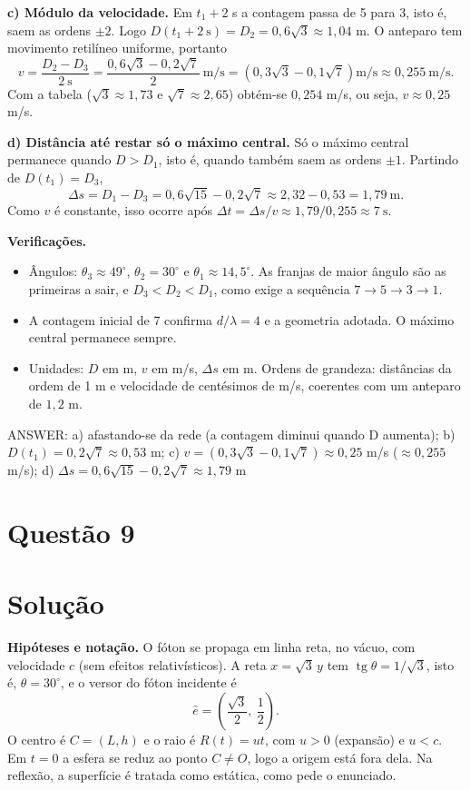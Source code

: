 \documentclass{article}%
\begin{document}
\textbf{c) Módulo da velocidade.} Em $t_1+2$ s a contagem passa de 5 para 3, isto é, saem as ordens $\pm 2$. Logo $D(t_1+2\ \text{s})=D_2=0{,}6\sqrt{3}\approx 1{,}04$ m. O anteparo tem movimento retilíneo uniforme, portanto
\[
v=\frac{D_2-D_3}{2\ \text{s}}=\frac{0{,}6\sqrt{3}-0{,}2\sqrt{7}}{2}\ \text{m/s}=\left(0{,}3\sqrt{3}-0{,}1\sqrt{7}\right)\text{m/s}\approx 0{,}255\ \text{m/s}.
\]
Com a tabela ($\sqrt{3}\approx 1{,}73$ e $\sqrt{7}\approx 2{,}65$) obtém-se $0{,}254$ m/s, ou seja, $v\approx 0{,}25$ m/s.

\textbf{d) Distância até restar só o máximo central.} Só o máximo central permanece quando $D>D_1$, isto é, quando também saem as ordens $\pm 1$. Partindo de $D(t_1)=D_3$,
\[
\Delta s=D_1-D_3=0{,}6\sqrt{15}-0{,}2\sqrt{7}\approx 2{,}32-0{,}53=1{,}79\ \text{m}.
\]
Como $v$ é constante, isso ocorre após $\Delta t=\Delta s/v\approx 1{,}79/0{,}255\approx 7\ \text{s}$.

\textbf{Verificações.}
\begin{itemize}
\item Ângulos: $\theta_3\approx 49^\circ$, $\theta_2=30^\circ$ e $\theta_1\approx 14{,}5^\circ$. As franjas de maior ângulo são as primeiras a sair, e $D_3<D_2<D_1$, como exige a sequência $7\to5\to3\to1$.
\item A contagem inicial de 7 confirma $d/\lambda=4$ e a geometria adotada. O máximo central permanece sempre.
\item Unidades: $D$ em m, $v$ em m/s, $\Delta s$ em m. Ordens de grandeza: distâncias da ordem de 1 m e velocidade de centésimos de m/s, coerentes com um anteparo de $1{,}2$ m.
\end{itemize}

ANSWER: a) afastando-se da rede (a contagem diminui quando D aumenta); b) $D(t_1)=0{,}2\sqrt{7}\approx 0{,}53$ m; c) $v=(0{,}3\sqrt{3}-0{,}1\sqrt{7})\approx 0{,}25$ m/s ($\approx 0{,}255$ m/s); d) $\Delta s=0{,}6\sqrt{15}-0{,}2\sqrt{7}\approx 1{,}79$ m%
\newpage%
\section*{Questão 9}

\section*{Solução}

\textbf{Hipóteses e notação.} O fóton se propaga em linha reta, no vácuo, com velocidade $c$ (sem efeitos relativísticos). A reta $x=\sqrt3\,y$ tem $\operatorname{tg}\theta=1/\sqrt3$, isto é, $\theta=30^\circ$, e o versor do fóton incidente é
\[
\hat e=\left(\frac{\sqrt3}{2},\ \frac12\right).
\]
O centro é $C=(L,h)$ e o raio é $R(t)=ut$, com $u>0$ (expansão) e $u<c$. Em $t=0$ a esfera se reduz ao ponto $C\neq O$, logo a origem está fora dela. Na reflexão, a superfície é tratada como estática, como pede o enunciado.
\end{document}
